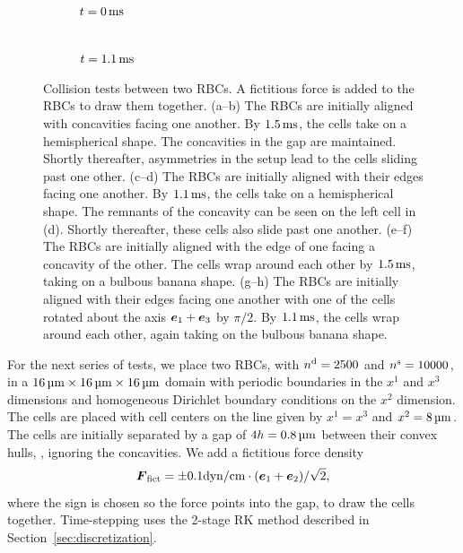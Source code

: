 \begin{figure}[thb]
\begin{subfigure}[t]{.25\textwidth}
        $t = 0\ms$
    \end{subfigure}%
    \begin{subfigure}[t]{.25\textwidth}
        \centering
         \\
        $t = 1.1\ms$
    \end{subfigure}
    \caption{%
Collision tests between two RBCs. A fictitious force is added to the RBCs to draw them
together. (a--b) The RBCs are initially aligned with concavities facing one another. By
$1.5\ms$, the cells take on a hemispherical shape. The concavities in the gap are
maintained. Shortly thereafter, asymmetries in the setup lead to the cells sliding past
one other. (c--d) The RBCs are initially aligned with their edges facing one
another. By $1.1\ms$, the cells take on a hemispherical shape. The remnants of the
concavity can be seen on the left cell in (d). Shortly thereafter, these cells also slide
past one another. (e--f) The RBCs are initially aligned with the edge of one facing a
concavity of the other. The cells wrap around each other by $1.5\ms$, taking on a bulbous
banana shape. (g--h) The RBCs are initially aligned with their edges facing one another
with one of the cells rotated about the axis $\e_1+\e_3$ by $\pi/2$. By $1.1\ms$, the
cells wrap around each other, again taking on the bulbous banana shape.
    }%
    \label{fig:collisions}
\end{figure}

For the next series of tests, we place two RBCs, with $\data\cardinality=2500$ and
$\sample\cardinality=10000$, in a $16\um\times16\um\times16\um$ domain with periodic
boundaries in the $x^1$ and $x^3$ dimensions and homogeneous Dirichlet boundary
conditions on the $x^2$ dimension. The cells are placed with cell centers on the line
given by $x^1 = x^3$ and $x^2 = 8\um$. The cells are initially separated by a gap of
$4h = 0.8\um$ between their convex hulls, , ignoring the concavities. We add
a fictitious force density
\begin{equation*}
    \F_\text{fict} = \pm 0.1\si{dyn\per\centi\meter}\cdot(\e_1+\e_2)/\sqrt{2},
\end{equation*}
where the sign is chosen so the force points into the gap, to draw the cells together.
Time-stepping uses the 2-stage RK method described in Section~\ref{sec:discretization}.

